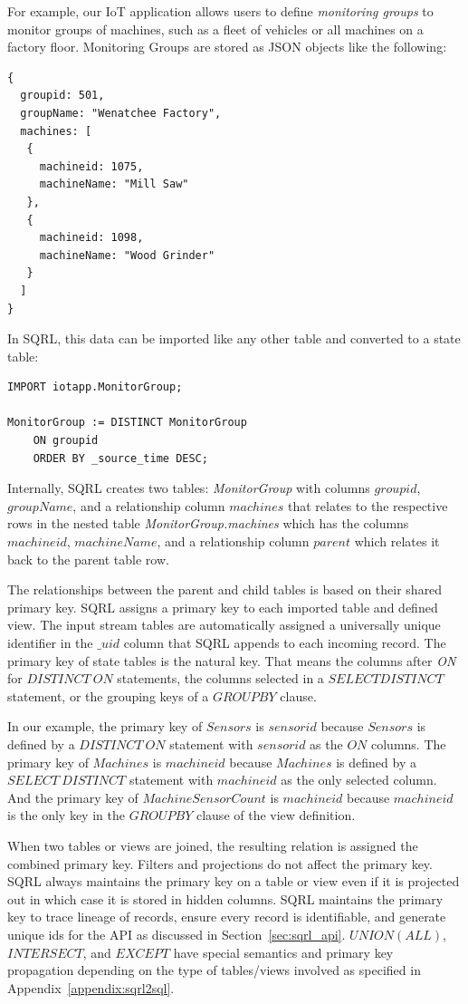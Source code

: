 \documentclass[	DIV=calc,%
							paper=letter,%
							fontsize=11pt,%
							twocolumn]{scrartcl}	 					%
\begin{document}
For example, our IoT application allows users to define \emph{monitoring groups} to monitor groups of machines, such as a fleet of vehicles or all machines on a factory floor. Monitoring Groups are stored as JSON objects like the following:

\begin{lstlisting}
{
  groupid: 501,
  groupName: "Wenatchee Factory",
  machines: [
   {
     machineid: 1075,
     machineName: "Mill Saw"
   },
   {
     machineid: 1098,
     machineName: "Wood Grinder"
   }
  ]
}
\end{lstlisting}

In SQRL, this data can be imported like any other table and converted to a state table:
\begin{lstlisting}
IMPORT iotapp.MonitorGroup;

MonitorGroup := DISTINCT MonitorGroup
    ON groupid
    ORDER BY _source_time DESC;
\end{lstlisting}

Internally, SQRL creates two tables: \emph{MonitorGroup} with columns $groupid$, $groupName$, and a relationship column $machines$ that relates to the respective rows in the nested table \emph{MonitorGroup.machines} which has the columns $machineid$, $machineName$, and a relationship column $parent$ which relates it back to the parent table row.

The relationships between the parent and child tables is based on their shared primary key. SQRL assigns a primary key to each imported table and defined view. The input stream tables are automatically assigned a universally unique identifier in the $\_uid$ column that SQRL appends to each incoming record. The primary key of state tables is the natural key. That means the columns after \emph{ON} for $DISTINCT\ ON$ statements, the columns selected in a $SELECT DISTINCT$ statement, or the grouping keys of a $GROUP BY$ clause.

In our example, the primary key of $Sensors$ is $sensorid$ because $Sensors$ is defined by a $DISTINCT\ ON$ statement with $sensorid$ as the $ON$ columns. The primary key of $Machines$ is $machineid$ because $Machines$ is defined by a $SELECT\ DISTINCT$ statement with $machineid$ as the only selected column. And the primary key of $MachineSensorCount$ is $machineid$ because $machineid$ is the only key in the $GROUP BY$ clause of the view definition.

When two tables or views are joined, the resulting relation is assigned the combined primary key. Filters and projections do not affect the primary key. SQRL always maintains the primary key on a table or view even if it is projected out in which case it is stored in hidden columns. SQRL maintains the primary key to trace lineage of records, ensure every record is identifiable, and generate unique ids for the API as discussed in Section~\ref{sec:sqrl_api}. $UNION (ALL)$, $INTERSECT$, and $EXCEPT$ have special semantics and primary key propagation depending on the type of tables/views involved as specified in Appendix~\ref{appendix:sqrl2sql}.
\end{document}
